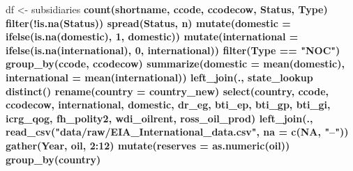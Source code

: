 \documentclass[11pt,]{book}
\newenvironment{Shaded}{\begin{snugshade}}{\end{snugshade}}
\newcommand{\DataTypeTok}[1]{\textcolor[rgb]{0.13,0.29,0.53}{#1}}
\newcommand{\DecValTok}[1]{\textcolor[rgb]{0.00,0.00,0.81}{#1}}
\newcommand{\KeywordTok}[1]{\textcolor[rgb]{0.13,0.29,0.53}{\textbf{#1}}}
\newcommand{\NormalTok}[1]{#1}
\newcommand{\OperatorTok}[1]{\textcolor[rgb]{0.81,0.36,0.00}{\textbf{#1}}}
\newcommand{\OtherTok}[1]{\textcolor[rgb]{0.56,0.35,0.01}{#1}}
\newcommand{\StringTok}[1]{\textcolor[rgb]{0.31,0.60,0.02}{#1}}
\begin{document}
\begin{Shaded}
\begin{Highlighting}[]
\NormalTok{df <-}\StringTok{ }\NormalTok{subsidiaries }\OperatorTok{%
\StringTok{  }\KeywordTok{count}\NormalTok{(shortname, ccode, ccodecow, Status, Type) }\OperatorTok{%
\StringTok{  }\KeywordTok{filter}\NormalTok{(}\OperatorTok{!}\KeywordTok{is.na}\NormalTok{(Status)) }\OperatorTok{%
\StringTok{  }\KeywordTok{spread}\NormalTok{(Status, n) }\OperatorTok{%
\StringTok{  }\KeywordTok{mutate}\NormalTok{(}\DataTypeTok{domestic =} \KeywordTok{ifelse}\NormalTok{(}\KeywordTok{is.na}\NormalTok{(domestic), }\DecValTok{1}\NormalTok{, domestic)) }\OperatorTok{%
\StringTok{  }\KeywordTok{mutate}\NormalTok{(}\DataTypeTok{international =} \KeywordTok{ifelse}\NormalTok{(}\KeywordTok{is.na}\NormalTok{(international), }\DecValTok{0}\NormalTok{, international)) }\OperatorTok{%
\StringTok{  }\KeywordTok{filter}\NormalTok{(Type }\OperatorTok{==}\StringTok{ "NOC"}\NormalTok{) }\OperatorTok{%
\StringTok{  }\KeywordTok{group_by}\NormalTok{(ccode, ccodecow) }\OperatorTok{%
\StringTok{  }\KeywordTok{summarize}\NormalTok{(}\DataTypeTok{domestic =} \KeywordTok{mean}\NormalTok{(domestic),}
            \DataTypeTok{international =} \KeywordTok{mean}\NormalTok{(international)) }\OperatorTok{%
\StringTok{  }\KeywordTok{left_join}\NormalTok{(., state_lookup }\OperatorTok{%
\StringTok{  }\KeywordTok{distinct}\NormalTok{() }\OperatorTok{%
\StringTok{  }\KeywordTok{rename}\NormalTok{(}\DataTypeTok{country =}\NormalTok{ country_new) }\OperatorTok{%
\StringTok{  }\KeywordTok{select}\NormalTok{(country, ccode, ccodecow, international, domestic,}
\NormalTok{         dr_eg, bti_ep, bti_gp, bti_gi, icrg_qog, fh_polity2, }
\NormalTok{         wdi_oilrent, ross_oil_prod) }\OperatorTok{%
\StringTok{  }\KeywordTok{left_join}\NormalTok{(.,}
            \KeywordTok{read_csv}\NormalTok{(}\StringTok{"data/raw/EIA_International_data.csv"}\NormalTok{, }\DataTypeTok{na =} \KeywordTok{c}\NormalTok{(}\OtherTok{NA}\NormalTok{, }\StringTok{"--"}\NormalTok{)) }\OperatorTok{%
\StringTok{              }\KeywordTok{gather}\NormalTok{(Year, oil, }\DecValTok{2}\OperatorTok{:}\DecValTok{12}\NormalTok{) }\OperatorTok{%
\StringTok{              }\KeywordTok{mutate}\NormalTok{(}\DataTypeTok{reserves =} \KeywordTok{as.numeric}\NormalTok{(oil)) }\OperatorTok{%
\StringTok{              }\KeywordTok{group_by}\NormalTok{(country) }\OperatorTok{%
}}}}}}}}}}}}}}}}}
\end{Highlighting}
\end{Shaded}
\end{document}

